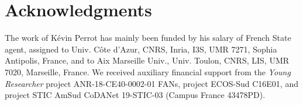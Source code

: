 \documentclass[11pt,a4paper]{article}
\newcommand{\1}{\mathbb{1}}
\newcommand{\0}{\mathbb{0}}
\begin{document}
\section*{Acknowledgments}

The work of K\'evin Perrot has mainly been funded by his salary of French State agent, assigned to
Univ. C{\^o}te d'Azur, CNRS, Inria, I3S, UMR 7271, Sophia Antipolis, France,
and to
Aix Marseille Univ., Univ. Toulon, CNRS, LIS, UMR 7020, Marseille, France.
We received auxiliary financial support from
the \emph{Young Researcher} project ANR-18-CE40-0002-01 FANs,
project ECOS-Sud C16E01, and
project STIC AmSud CoDANet 19-STIC-03 (Campus France 43478PD).



\end{document}

